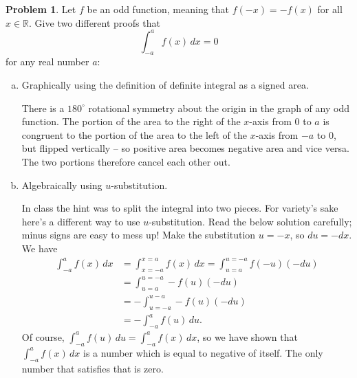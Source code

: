 \documentclass[11pt,oneside]{amsart}
\theoremstyle{definition}
\newtheorem{problem}{Problem}
\newcommand{\bR}{\mathbb{R}}
\begin{document}
    \begin{problem}
        Let $f$ be an odd function, meaning that $f(-x)=-f(x)$ for all $x\in\bR$. Give two different proofs that
        \[\int_{-a}^a f(x)\,dx=0\]
        for any real number $a$:
        \begin{enumerate}[(a)]
            \item Graphically using the definition of definite integral as a signed area.
            \begin{solution}
                There is a $180^\circ$ rotational symmetry about the origin in the graph of any odd function. The portion of the area to the right of the $x$-axis from 0 to $a$ is congruent to the portion of the area to the left of the $x$-axis from $-a$ to 0, but flipped vertically -- so positive area becomes negative area and vice versa. The two portions therefore cancel each other out.
            \end{solution}
            \item Algebraically using $u$-substitution.
            \begin{solution}
                In class the hint was to split the integral into two pieces. For variety's sake here's a different way to use $u$-substitution. Read the below solution carefully; minus signs are easy to mess up!
                Make the substitution $u=-x$, so $du=-dx$. We have
                \[\begin{split}
                    \int_{-a}^a f(x)\,dx &= \int_{x=-a}^{x=a} f(x)\,dx= \int_{u=a}^{u=-a}f(-u)(-du)\\
                    &= \int_{u=a}^{u=-a}-f(u)(-du)\\
                    &= -\int_{u=-a}^{u-a}-f(u)(-du)\\
                    &= -\int_{-a}^a f(u)\,du.
                \end{split}\]
                Of course, $\int_{-a}^a f(u)\,du=\int_{-a}^a f(x)\,dx$, so we have shown that $\int_{-a}^a f(x)\,dx$ is a number which is equal to negative of itself. The only number that satisfies that is zero.
            \end{solution}
        \end{enumerate}
    \end{problem}
\end{document}
